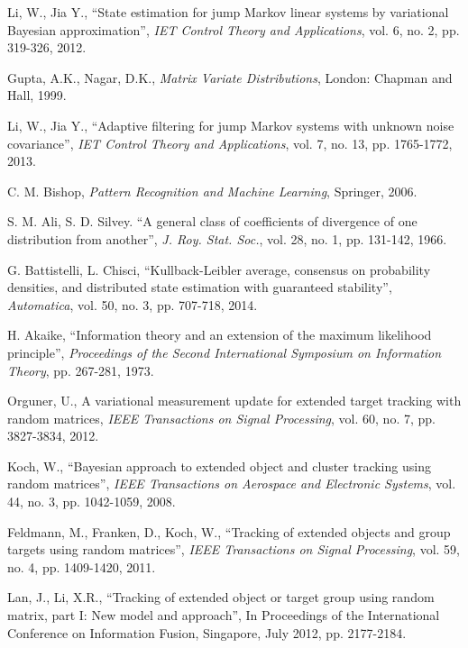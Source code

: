 \documentclass[12pt,draftcls,onecolumn]{IEEEtran}
\begin{document}
\begin{thebibliography}{99}
Li, W., Jia Y., ``State estimation for jump Markov linear systems by
variational Bayesian approximation'', \emph{IET Control Theory and
Applications}, vol. 6, no. 2, pp. 319-326, 2012.

Gupta, A.K., Nagar, D.K., \emph{Matrix Variate Distributions},
London: Chapman and Hall, 1999.


Li, W., Jia Y., ``Adaptive filtering for jump Markov systems with
unknown noise covariance'', \emph{IET Control Theory and
Applications}, vol. 7, no. 13, pp. 1765-1772, 2013.





C. M. Bishop, \emph{Pattern Recognition and Machine Learning},
Springer, 2006.



 S. M. Ali, S. D.
Silvey. ``A general class of coefficients of divergence of one
distribution from another'', \emph{J. Roy. Stat. Soc.}, vol. 28, no.
1, pp. 131-142, 1966.



G. Battistelli, L. Chisci, ``Kullback-Leibler average, consensus on
probability densities, and distributed state estimation with
guaranteed stability'', \emph{Automatica}, vol. 50, no. 3, pp.
707-718, 2014.


H. Akaike, ``Information theory and an extension of the maximum
likelihood principle'', \emph{Proceedings of the Second
International Symposium on Information Theory}, pp. 267-281, 1973.



Orguner, U., A variational measurement update for extended target
tracking with random matrices, \emph{IEEE Transactions on Signal
Processing}, vol. 60, no. 7, pp. 3827-3834, 2012.


Koch, W., ``Bayesian approach to extended object and cluster
tracking using random matrices'', \emph{IEEE Transactions on
Aerospace and Electronic Systems}, vol. 44, no. 3, pp. 1042-1059,
2008.


Feldmann, M., Franken, D., Koch, W., ``Tracking of extended objects
and group targets using random matrices'', \emph{IEEE Transactions
on Signal Processing}, vol. 59, no. 4, pp. 1409-1420, 2011.



Lan, J., Li, X.R., ``Tracking of extended object or target group
using random matrix, part I: New model and approach'', In
Proceedings of the International Conference on Information Fusion,
Singapore, July 2012, pp. 2177-2184.


\end{thebibliography}
\end{document}
